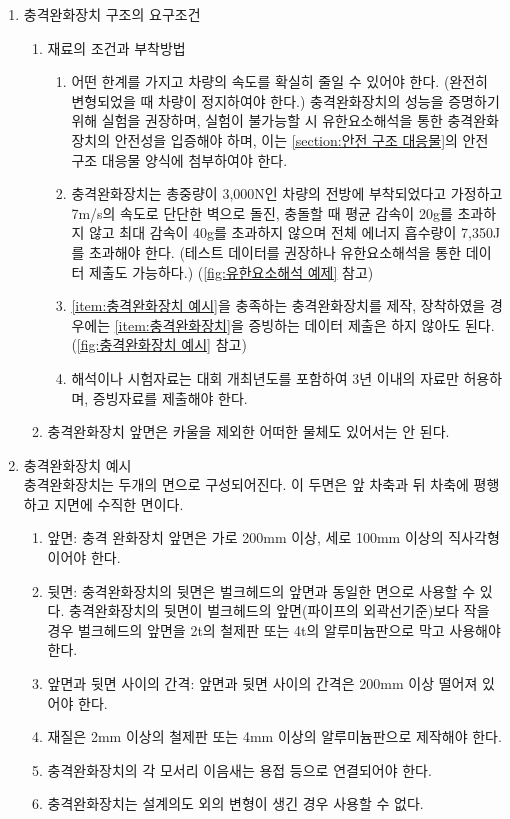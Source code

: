 \documentclass[final,a4paper,10pt]{report}
\begin{document}
\begin{enumerate}
  \item 충격완화장치 구조의 요구조건 \label{item:충격완화장치}
    \begin{enumerate}
      \item 재료의 조건과 부착방법
        \begin{enumerate}
          \item 어떤 한계를 가지고 차량의 속도를 확실히 줄일 수 있어야 한다. (완전히 변형되었을 때 차량이 정지하여야 한다.) 충격완화장치의 성능을 증명하기 위해 실험을 권장하며, 실험이 불가능할 시 유한요소해석을 통한 충격완화장치의 안전성을 입증해야 하며, 이는 \cref{section:안전 구조 대응물}의 안전 구조 대응물 양식에 첨부하여야 한다.
          \item 충격완화장치는 총중량이 3,000N인 차량의 전방에 부착되었다고 가정하고 7m/s의 속도로 단단한 벽으로 돌진, 충돌할 때 평균 감속이 20g를 초과하지 않고 최대 감속이 40g를 초과하지 않으며 전체 에너지 흡수량이 7,350J를 초과해야 한다. (테스트 데이터를 권장하나 유한요소해석을 통한 데이터 제출도 가능하다.) (\cref{fig:유한요소해석 예제} 참고)
          \item \cref{item:충격완화장치 예시}을 충족하는 충격완화장치를 제작, 장착하였을 경우에는 \cref{item:충격완화장치}을 증빙하는 데이터 제출은 하지 않아도 된다. (\cref{fig:충격완화장치 예시} 참고)
          \item 해석이나 시험자료는 대회 개최년도를 포함하여 3년 이내의 자료만 허용하며, 증빙자료를 제출해야 한다.
          
        \end{enumerate}
      \item 충격완화장치 앞면은 카울을 제외한 어떠한 물체도 있어서는 안 된다.
    \end{enumerate}
    
  \item 충격완화장치 예시 \label{item:충격완화장치 예시}\\
    충격완화장치는 두개의 면으로 구성되어진다. 이 두면은 앞 차축과 뒤 차축에 평행하고 지면에 수직한 면이다.
    \begin{enumerate}
      \item 앞면: 충격 완화장치 앞면은 가로 200mm 이상, 세로 100mm 이상의 직사각형이어야 한다.
      \item 뒷면: 충격완화장치의 뒷면은 벌크헤드의 앞면과 동일한 면으로 사용할 수 있다. 충격완화장치의 뒷면이 벌크헤드의 앞면(파이프의 외곽선기준)보다 작을 경우 벌크헤드의 앞면을 2t의 철제판 또는 4t의 알루미늄판으로 막고 사용해야 한다.
      \item 앞면과 뒷면 사이의 간격: 앞면과 뒷면 사이의 간격은 200mm 이상 떨어져 있어야 한다.
      \item 재질은 2mm 이상의 철제판 또는 4mm 이상의 알루미늄판으로 제작해야 한다.
      \item 충격완화장치의 각 모서리 이음새는 용접 등으로 연결되어야 한다.
      \item 충격완화장치는 설계의도 외의 변형이 생긴 경우 사용할 수 없다.
      

\end{enumerate}
\end{enumerate}
\end{document}
